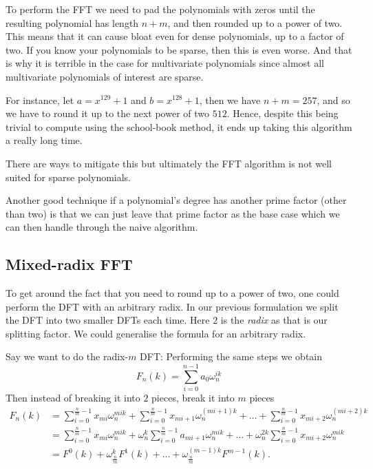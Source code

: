 \begin{remark}
    To perform the FFT we need to pad the polynomials with zeros until the resulting polynomial has length $n + m$, and then rounded up to a power of two. This means that it can cause bloat even for dense polynomials, up to a factor of two. If you know your polynomials to be sparse, then this is even worse. And that is why it is terrible in the case for multivariate polynomials since almost all multivariate polynomials of interest are sparse.

    For instance, let $a = x^{129} + 1$ and $b = x^{128} + 1$, then we have $n + m = 257$, and so we have to round it up to the next power of two $512$. Hence, despite this being trivial to compute using the school-book method, it ends up taking this algorithm a really long time.

    There are ways to mitigate this but ultimately the FFT algorithm is not well suited for sparse polynomials.

    Another good technique if a polynomial's degree has another prime factor (other than two) is that we can just leave that prime factor as the base case which we can then handle through the naive algorithm.
\end{remark}

\subsection{Mixed-radix FFT}

To get around the fact that you need to round up to a power of two, one could perform the DFT with an arbitrary radix. In our previous formulation we split the DFT into two smaller DFTs each time. Here $2$ is the \emph{radix} as that is our splitting factor. We could generalise the formula for an arbitrary radix.

Say we want to do the radix-$m$ DFT:
Performing the same steps we obtain
\[
    F_n(k) = \sum^{n-1}_{i=0} a_0\omega_n^{ik}
\]
Then instead of breaking it into $2$ pieces, break it into $m$ pieces
\begin{align*}
    F_n(k) &= \sum^{\frac{n}{m}-1}_{i=0} x_{mi}\omega_n^{mik} + \sum^{\frac{n}{m}-1}_{i=0} x_{mi+1}\omega_n^{(mi+1)k} + \ldots + \sum^{\frac{n}{m}-1}_{i=0} x_{mi+2}\omega_n^{(mi+2)k}\\
          &= \sum^{\frac{n}{m}-1}_{i=0} x_{mi}\omega_n^{mik} + \omega_n^k\sum^{\frac{n}{m}-1}_{i=0} a_{mi+1}\omega_n^{mik} + \ldots +  \omega_n^{2k}\sum^{\frac{n}{m}-1}_{i=0} x_{mi+2}\omega_n^{mik}\\
          &= F^0(k) + \omega_{\frac{n}{m}}^k F^1(k) + \ldots + \omega_{\frac{n}{m}}^{(m-1)k} F^{m-1}(k).
\end{align*}

